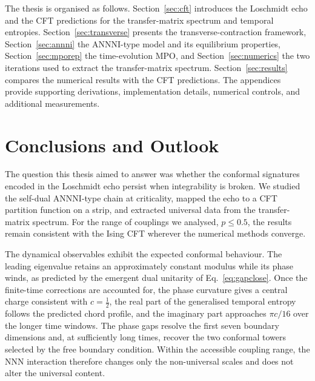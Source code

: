 \documentclass[a4paper,onecolumn,11pt,unpublished]{quantumarticle}
\begin{document}
The thesis is organised as follows. Section~\ref{sec:cft} introduces the Loschmidt echo and the \ac{CFT} predictions for the transfer-matrix spectrum and temporal entropies. Section~\ref{sec:transverse} presents the transverse-contraction framework, Section~\ref{sec:annni} the ANNNI-type model and its equilibrium properties, Section~\ref{sec:mporep} the time-evolution \ac{MPO}, and Section~\ref{sec:numerics} the two iterations used to extract the transfer-matrix spectrum. Section~\ref{sec:results} compares the numerical results with the \ac{CFT} predictions. The appendices provide supporting derivations, implementation details, numerical controls, and additional measurements.














\FloatBarrier
\section{Conclusions and Outlook}
\label{sec:conclusions}

The question this thesis aimed to answer was whether the conformal signatures encoded in the Loschmidt echo persist when integrability is broken. We studied the self-dual \ac{ANNNI}-type chain at criticality, mapped the echo to a \ac{CFT} partition function on a strip, and extracted universal data from the transfer-matrix spectrum. For the range of couplings we analysed, $p\leq0.5$, the results remain consistent with the Ising \ac{CFT} wherever the numerical methods converge.

The dynamical observables exhibit the expected conformal behaviour. The leading eigenvalue retains an approximately constant modulus while its phase winds, as predicted by the emergent dual unitarity of Eq.~\eqref{eq:gapclose}. Once the finite-time corrections are accounted for, the phase curvature gives a central charge consistent with $c=\tfrac12$, the real part of the generalised temporal entropy follows the predicted chord profile, and the imaginary part approaches $\pi c/16$ over the longer time windows. The phase gaps resolve the first seven boundary dimensions and, at sufficiently long times, recover the two conformal towers selected by the free boundary condition. Within the accessible coupling range, the \ac{NNN} interaction therefore changes only the non-universal scales and does not alter the universal content.
\end{document}
